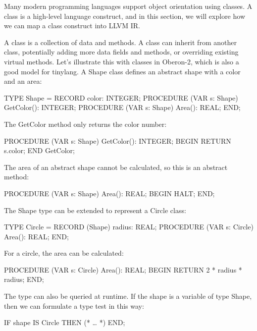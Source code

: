 
Many modern programming languages support object orientation using classes. A class is a high-level language construct, and in this section, we will explore how we can map a class construct into LLVM IR.


A class is a collection of data and methods. A class can inherit from another class, potentially adding more data fields and methods, or overriding existing virtual methods. Let’s illustrate this with classes in Oberon-2, which is also a good model for tinylang. A Shape class defines an abstract shape with a color and an area:

\begin{shell}
TYPE Shape = RECORD
                color: INTEGER;
                PROCEDURE (VAR s: Shape) GetColor(): INTEGER;
                PROCEDURE (VAR s: Shape) Area(): REAL;
             END;
\end{shell}

The GetColor method only returns the color number:

\begin{shell}
PROCEDURE (VAR s: Shape) GetColor(): INTEGER;
BEGIN RETURN s.color; END GetColor;
\end{shell}

The area of an abstract shape cannot be calculated, so this is an abstract method:

\begin{shell}
PROCEDURE (VAR s: Shape) Area(): REAL;
BEGIN HALT; END;
\end{shell}

The Shape type can be extended to represent a Circle class:

\begin{shell}
TYPE Circle = RECORD (Shape)
                radius: REAL;
                PROCEDURE (VAR s: Circle) Area(): REAL;
              END;
\end{shell}

For a circle, the area can be calculated:

\begin{shell}
PROCEDURE (VAR s: Circle) Area(): REAL;
BEGIN RETURN 2 * radius * radius; END;
\end{shell}

The type can also be queried at runtime. If the shape is a variable of type Shape, then we can formulate a type test in this way:

\begin{shell}
IF shape IS Circle THEN (* … *) END;
\end{shell}

